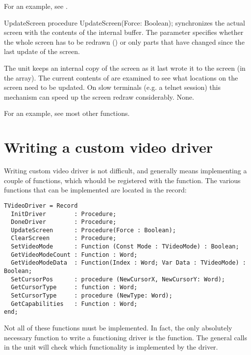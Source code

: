 For an example, see .

\begin{procedure}{UpdateScreen}
\Declaration
procedure UpdateScreen(Force: Boolean); 
\Description
{} synchronizes the actual screen with the contents
of the  internal buffer. The parameter 
specifies whether the whole screen has to be redrawn ()
or only parts that have changed since the last update of the screen.

The  unit keeps an internal copy of the screen as it last 
wrote it to the screen (in the  array). The current 
contents of  are examined to see what locations on the 
screen need to be updated. On slow terminals (e.g. a \linux telnet 
session) this mechanism can speed up the screen redraw considerably.
\Errors
None.
\SeeAlso
{}
\end{procedure}

For an example, see most other functions.

\section{Writing a custom video driver}
\label{se:viddriver}
Writing custom video driver is not difficult, and generally means
implementing a couple of functions, which whould be registered with
the  function. The various functions that can be
implemented are located in the  record:
\begin{verbatim}
TVideoDriver = Record
  InitDriver        : Procedure;
  DoneDriver        : Procedure;
  UpdateScreen      : Procedure(Force : Boolean);
  ClearScreen       : Procedure;
  SetVideoMode      : Function (Const Mode : TVideoMode) : Boolean;
  GetVideoModeCount : Function : Word;
  GetVideoModeData  : Function(Index : Word; Var Data : TVideoMode) : Boolean;
  SetCursorPos      : procedure (NewCursorX, NewCursorY: Word);
  GetCursorType     : function : Word;
  SetCursorType     : procedure (NewType: Word);
  GetCapabilities   : Function : Word;
end;
\end{verbatim}
Not all of these functions must be implemented. In fact, the only absolutely
necessary function to write a functioning driver is the  
function. The general calls in the  unit will check which
functionality is implemented by the driver.

